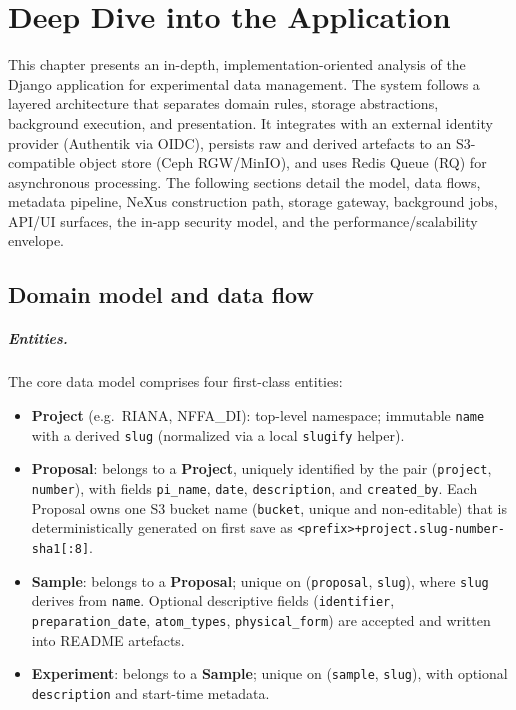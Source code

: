 \chapter{Deep Dive into the Application}\label{chap:deep-dive-app}

This chapter presents an in-depth, implementation-oriented analysis of the Django application for experimental data management. The system follows a layered architecture that separates domain rules, storage abstractions, background execution, and presentation. It integrates with an external identity provider (Authentik via OIDC), persists raw and derived artefacts to an S3-compatible object store (Ceph RGW/MinIO), and uses Redis Queue (RQ) for asynchronous processing. The following sections detail the model, data flows, metadata pipeline, NeXus construction path, storage gateway, background jobs, API/UI surfaces, the in-app security model, and the performance/scalability envelope.

\section{Domain model and data flow}\label{sec:domain-dataflow}

\paragraph{Entities.}
The core data model comprises four first-class entities:
\begin{itemize}
	\item \textbf{Project} (e.g.\ RIANA, NFFA\_DI): top-level namespace; immutable \texttt{name} with a derived \texttt{slug} (normalized via a local \texttt{slugify} helper).
	
	\item \textbf{Proposal}: belongs to a \textbf{Project}, uniquely identified by the pair (\texttt{project}, \texttt{number}), with fields \texttt{pi\_name}, \texttt{date}, \texttt{description}, and \texttt{created\_by}. Each Proposal owns one S3 bucket name (\texttt{bucket}, unique and non-editable) that is deterministically generated on first save as \texttt{<prefix>+project.slug-number-sha1[:8]}.
	
	\item \textbf{Sample}: belongs to a \textbf{Proposal}; unique on (\texttt{proposal}, \texttt{slug}), where \texttt{slug} derives from \texttt{name}. Optional descriptive fields (\texttt{identifier}, \texttt{preparation\_date}, \texttt{atom\_types}, \texttt{physical\_form}) are accepted and written into README artefacts.
	
	\item \textbf{Experiment}: belongs to a \textbf{Sample}; unique on (\texttt{sample}, \texttt{slug}), with optional \texttt{description} and start-time metadata.
\end{itemize}

